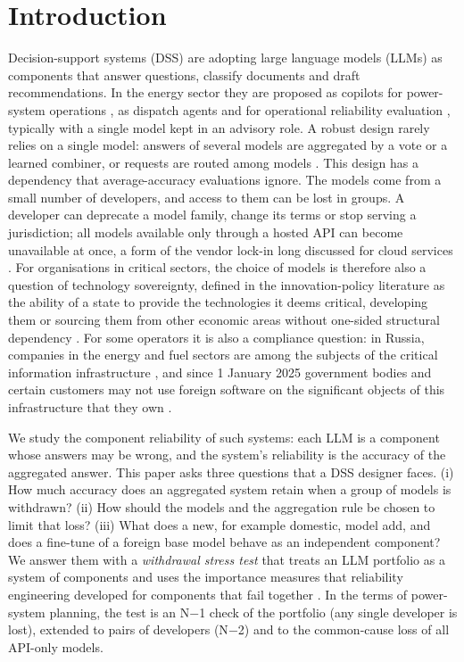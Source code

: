 \documentclass[preprint,12pt,authoryear]{elsarticle}
\begin{document}
\linenumbers

\section{Introduction}

Decision-support systems (DSS) are adopting large language models (LLMs) as components that answer questions, classify documents and draft recommendations. In the energy sector they are proposed as copilots for power-system operations \citep{sulaima2026trustworthy}, as dispatch agents \citep{zhao2026dispatch} and for operational reliability evaluation \citep{cheng2026reliability}, typically with a single model kept in an advisory role. A robust design rarely relies on a single model: answers of several models are aggregated by a vote or a learned combiner, or requests are routed among models \citep{jiang2023blender,wang2025moa,chen2024frugalgpt,ong2025routellm}. This design has a dependency that average-accuracy evaluations ignore. The models come from a small number of developers, and access to them can be lost in groups. A developer can deprecate a model family, change its terms or stop serving a jurisdiction; all models available only through a hosted API can become unavailable at once, a form of the vendor lock-in long discussed for cloud services \citep{oparamartins2016}. For organisations in critical sectors, the choice of models is therefore also a question of technology sovereignty, defined in the innovation-policy literature as the ability of a state to provide the technologies it deems critical, developing them or sourcing them from other economic areas without one-sided structural dependency \citep{edler2023}. For some operators it is also a compliance question: in Russia, companies in the energy and fuel sectors are among the subjects of the critical information infrastructure \citep{fz187}, and since 1 January 2025 government bodies and certain customers may not use foreign software on the significant objects of this infrastructure that they own \citep{ukaz166}.

We study the component reliability of such systems: each LLM is a component whose answers may be wrong, and the system's reliability is the accuracy of the aggregated answer. This paper asks three questions that a DSS designer faces. (i) How much accuracy does an aggregated system retain when a group of models is withdrawn? (ii) How should the models and the aggregation rule be chosen to limit that loss? (iii) What does a new, for example domestic, model add, and does a fine-tune of a foreign base model behave as an independent component? We answer them with a \emph{withdrawal stress test} that treats an LLM portfolio as a system of components and uses the importance measures that reliability engineering developed for components that fail together \citep{birnbaum1969,vesely1983,borgonovo2001,honglie1993}. In the terms of power-system planning, the test is an N$-$1 check of the portfolio (any single developer is lost), extended to pairs of developers (N$-$2) and to the common-cause loss of all API-only models.
\end{document}
